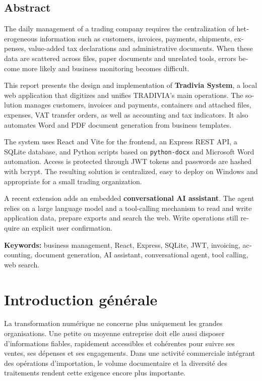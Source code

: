 \documentclass[12pt,a4paper,oneside]{report}
\newcommand{\code}[1]{\texttt{#1}}
\begin{document}
\begin{otherlanguage}{english}
\chapter*{Abstract}
The daily management of a trading company requires the centralization of heterogeneous information such as customers, invoices, payments, shipments, expenses, value-added tax declarations and administrative documents. When these data are scattered across files, paper documents and unrelated tools, errors become more likely and business monitoring becomes difficult.

This report presents the design and implementation of \textbf{Tradivia System}, a local web application that digitizes and unifies TRADIVIA's main operations. The solution manages customers, invoices and payments, containers and attached files, expenses, VAT transfer orders, as well as accounting and tax indicators. It also automates Word and PDF document generation from business templates.

The system uses React and Vite for the frontend, an Express REST API, a SQLite database, and Python scripts based on \code{python-docx} and Microsoft Word automation. Access is protected through JWT tokens and passwords are hashed with bcrypt. The resulting solution is centralized, easy to deploy on Windows and appropriate for a small trading organization.

A recent extension adds an embedded \textbf{conversational AI assistant}. The agent relies on a large language model and a tool-calling mechanism to read and write application data, prepare exports and search the web. Write operations still require an explicit user confirmation.

\textbf{Keywords:} business management, React, Express, SQLite, JWT, invoicing, accounting, document generation, AI assistant, conversational agent, tool calling, web search.
\end{otherlanguage}


\chapter*{Introduction générale}
La transformation numérique ne concerne plus uniquement les grandes organisations. Une petite ou moyenne entreprise doit elle aussi disposer d'informations fiables, rapidement accessibles et cohérentes pour suivre ses ventes, ses dépenses et ses engagements. Dans une activité commerciale intégrant des opérations d'importation, le volume documentaire et la diversité des traitements rendent cette exigence encore plus importante.
\end{document}
